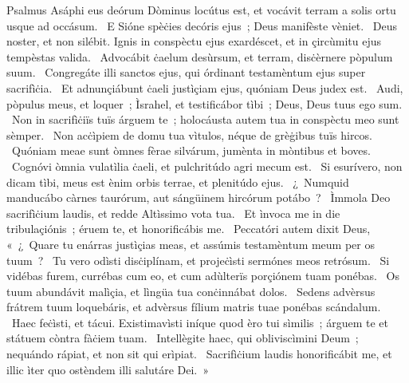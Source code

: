 { Psalmus Asáphi}
{%
eus deórum Dòminus locútus est, et vocávit terram a solis ortu usque ad occásum. 
~E Sióne spèċies decóris ejus~; Deus manifèste vèniet. 
~Deus noster, et non silébit. Ignis in conspèctu ejus exardéscet, et in çircùmitu ejus tempèstas valida. 
~Advocábit ċaelum desùrsum, et terram, disċèrnere pòpulum suum. 
~Congregáte illi sanctos ejus, qui órdinant testamèntum ejus super sacrifìċia. 
~Et adnunçiábunt ċaeli justìçiam ejus, quóniam Deus judex est. 
~Audi, pòpulus meus, et loquer~; Ìsrahel, et testificábor tìbi~; Deus, Deus tuus ego sum. 
~Non in sacrifìċiïs tuïs árguem te~; holocáusta autem tua in conspèctu meo sunt sèmper. 
~Non acċìpiem de domu tua vìtulos, néque de grèġibus tuïs hircos. 
~Quóniam meae sunt òmnes fèrae silvárum, jumènta in mòntibus et boves. 
~Cognóvi òmnia vulatìlia ċaeli, et pulchritúdo agri mecum est. 
~Si esurívero, non dicam tìbi, meus est ènim orbis terrae, et plenitúdo ejus. 
~¿~Numquid manducábo càrnes taurórum, aut sángüinem hircórum potábo~? 
~Ìmmola Deo sacrifìċium laudis, et redde Altìssimo vota tua. 
~Et ìnvoca me in die tribulaçiónis~; éruem te, et honorificábis me. 
~Peccatóri autem dixit Deus, «~¿~Quare tu enárras justìçias meas, et assúmis testamèntum meum per os tuum~? 
~Tu vero odìsti disċiplínam, et projeċìsti sermónes meos retrósum. 
~Si vidébas furem, currébas cum eo, et cum adùlterïs porçiónem tuam ponébas. 
~Os tuum abundávit malìçia, et lìngüa tua conċinnábat dolos. 
~Sedens advèrsus frátrem tuum loquebáris, et advèrsus fílium matris tuae ponébas scándalum. 
~Haec feċìsti, et tácui. Existimavìsti iníque quod èro tui sìmilis~; árguem te et státuem còntra fàċiem tuam. 
~Intellègite haec, qui obliviscìmini Deum~; nequándo rápiat, et non sit qui erìpiat. 
~Sacrifìċium laudis honorificábit me, et illic ìter quo ostèndem illi salutáre Dei.~»
}
